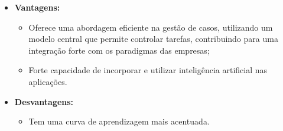         \begin{itemize}
        \item \textbf{Vantagens:}
            \begin{itemize}
            \item Oferece uma abordagem eficiente na gestão de casos, utilizando um modelo central que permite controlar tarefas, contribuindo para uma integração forte com os paradigmas das empresas\cite{o-que-e-gestao-de-casos-pega};
            \item Forte capacidade de incorporar e utilizar inteligência artificial nas aplicações.
            \end{itemize}
        
        \item \textbf{Desvantagens:}
            \begin{itemize}
            \item Tem uma curva de aprendizagem mais acentuada.
            \end{itemize}
        \end{itemize}    